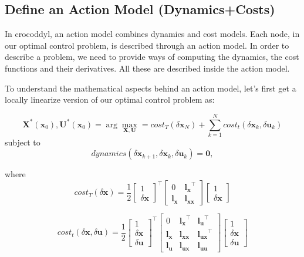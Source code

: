 \subsection{Define an Action Model (Dynamics+Costs)}
In crocoddyl, an action model combines dynamics and cost models. Each node, in our optimal control problem, is described through an action model. In order to describe a problem, we need to provide ways of computing the dynamics, the cost functions and their derivatives. All these are described inside the action model.

To understand the mathematical aspects behind an action model, let's first get a locally linearize version of our optimal control problem as:

$$\mathbf{X}^*(\mathbf{x}_0),\mathbf{U}^*(\mathbf{x}_0)
=
\arg\max_{\mathbf{X},\mathbf{U}} = cost_T(\delta\mathbf{x}_N) + \sum_{k=1}^N cost_t(\delta\mathbf{x}_k, \delta\mathbf{u}_k)$$
subject to
$$dynamics(\delta\mathbf{x}_{k+1},\delta\mathbf{x}_k,\delta\mathbf{u}_k)=\mathbf{0},$$

where
$$cost_T(\delta\mathbf{x}) = \frac{1}{2}
\begin{bmatrix} 
  1 \\ \delta\mathbf{x}
\end{bmatrix}^\top
\begin{bmatrix}
0 & \mathbf{l_x}^\top \\
\mathbf{l_x} & \mathbf{l_{xx}}
\end{bmatrix}
\begin{bmatrix}
  1 \\ \delta\mathbf{x}
\end{bmatrix}
$$

$$cost_t(\delta\mathbf{x},\delta\mathbf{u}) = \frac{1}{2}
\begin{bmatrix} 
  1 \\ \delta\mathbf{x} \\ \delta\mathbf{u}
\end{bmatrix}^\top
\begin{bmatrix}
0 & \mathbf{l_x}^\top & \mathbf{l_u}^\top\\
\mathbf{l_x} & \mathbf{l_{xx}} & \mathbf{l_{ux}}^\top\\
\mathbf{l_u} & \mathbf{l_{ux}} & \mathbf{l_{uu}}
\end{bmatrix}
\begin{bmatrix}
  1 \\ \delta\mathbf{x} \\ \delta\mathbf{u}
\end{bmatrix}
$$

